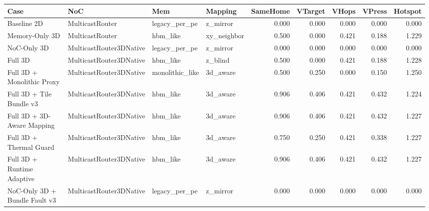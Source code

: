 \begin{tabular}{l l l l r r r r r}
\hline
Case & NoC & Mem & Mapping & SameHome & VTarget & VHops & VPress & Hotspot \\
\hline
Baseline 2D & MulticastRouter & legacy\_per\_pe & z\_mirror & 0.000 & 0.000 & 0.000 & 0.000 & 0.000 \\
Memory-Only 3D & MulticastRouter & hbm\_like & xy\_neighbor & 0.500 & 0.000 & 0.421 & 0.188 & 1.229 \\
NoC-Only 3D & MulticastRouter3DNative & legacy\_per\_pe & z\_mirror & 0.000 & 0.000 & 0.000 & 0.000 & 0.000 \\
Full 3D & MulticastRouter3DNative & hbm\_like & z\_blind & 0.500 & 0.000 & 0.421 & 0.188 & 1.228 \\
Full 3D + Monolithic Proxy & MulticastRouter3DNative & monolithic\_like & 3d\_aware & 0.500 & 0.250 & 0.000 & 0.150 & 1.250 \\
Full 3D + Tile Bundle v3 & MulticastRouter3DNative & hbm\_like & 3d\_aware & 0.906 & 0.406 & 0.421 & 0.432 & 1.224 \\
Full 3D + 3D-Aware Mapping & MulticastRouter3DNative & hbm\_like & 3d\_aware & 0.906 & 0.406 & 0.421 & 0.432 & 1.227 \\
Full 3D + Thermal Guard & MulticastRouter3DNative & hbm\_like & 3d\_aware & 0.750 & 0.250 & 0.421 & 0.338 & 1.227 \\
Full 3D + Runtime Adaptive & MulticastRouter3DNative & hbm\_like & 3d\_aware & 0.906 & 0.406 & 0.421 & 0.432 & 1.227 \\
NoC-Only 3D + Bundle Fault v3 & MulticastRouter3DNative & legacy\_per\_pe & z\_mirror & 0.000 & 0.000 & 0.000 & 0.000 & 0.000 \\
\hline
\end{tabular}
